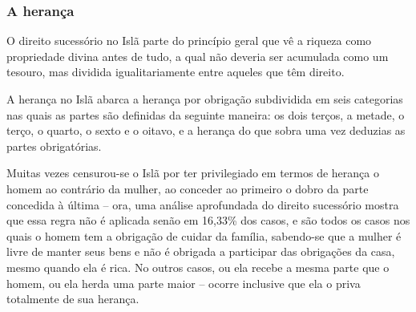 \documentclass[12pt]{article}
\begin{document}
\subsubsection{A herança}
O direito sucessório no Islã parte do princípio geral que vê a riqueza como propriedade divina antes de tudo, a qual não deveria ser acumulada como um tesouro, mas dividida igualitariamente entre aqueles que têm direito.
\par A herança no Islã abarca a herança por obrigação subdividida em seis categorias nas quais as partes são definidas da seguinte maneira: os dois terços, a metade, o terço, o quarto, o sexto e o oitavo, e a herança do que sobra uma vez deduzias as partes obrigatórias.
\par Muitas vezes censurou-se o Islã por ter privilegiado em termos de herança o homem ao contrário da mulher, ao conceder ao primeiro o dobro da parte concedida à última – ora, uma análise aprofundada do direito sucessório mostra que essa regra não é aplicada senão em 16,33\% dos casos, e são todos os casos nos quais o homem tem a obrigação de cuidar da família, sabendo-se que a mulher é livre de manter seus bens e não é obrigada a participar das obrigações da casa, mesmo quando ela é rica. No outros casos, ou ela recebe a mesma parte que o homem, ou ela herda uma parte maior – ocorre inclusive que ela o priva totalmente de sua herança.
\end{document}
